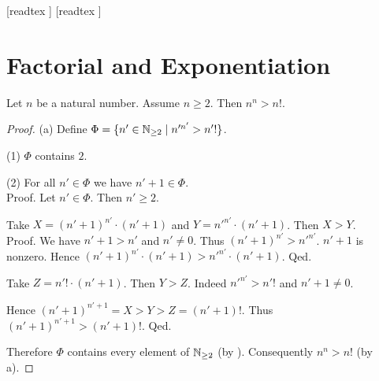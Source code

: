 \documentclass[10pt]{article}
\begin{document}
  \begin{imports}
    \begin{forthel}
      [readtex ]
      [readtex ]
    \end{forthel}
  \end{imports}


  \section*{Factorial and Exponentiation}

  \begin{forthel}
    \begin{proposition}
      Let $n$ be a natural number.
      Assume $n \geq 2$.
      Then $n^{n} > n!$.
    \end{proposition}
    \begin{proof}
      (a) Define $\Phi = \{ n' \in \mathbb{N}_{\geq 2} \mid n'^{n'} > n'! \}$.
  
      (1) $\Phi$ contains $2$.
  
      (2) For all $n' \in \Phi$ we have $n' + 1 \in \Phi$. \\
      Proof.
        Let $n' \in \Phi$.
        Then $n' \geq 2$.
  
        Take $X = (n' + 1)^{n'} \cdot (n' + 1)$ and $Y = n'^{n'} \cdot (n' + 1)$.
        Then $X > Y$. \\
        Proof.
          We have $n' + 1 > n'$ and $n' \neq 0$.
          Thus $(n' + 1)^{n'} > n'^{n'}$.
          $n' + 1$ is nonzero.
          Hence $(n' + 1)^{n'} \cdot (n' + 1) > n'^{n'} \cdot (n' + 1)$.
        Qed.
  
        Take $Z = n'! \cdot (n' + 1)$.
        Then $Y > Z$.
        Indeed $n'^{n'} > n'!$ and $n' + 1 \neq 0$.
  
        Hence $(n' + 1)^{n' + 1} = X > Y > Z = (n' + 1)!$.
        Thus $(n' + 1)^{n' + 1} > (n' + 1)!$.
      Qed.
  
      Therefore $\Phi$ contains every element of $\mathbb{N}_{\geq 2}$ (by ).
      Consequently $n^{n} > n!$ (by a).
    \end{proof}
  \end{forthel}
\end{document}

